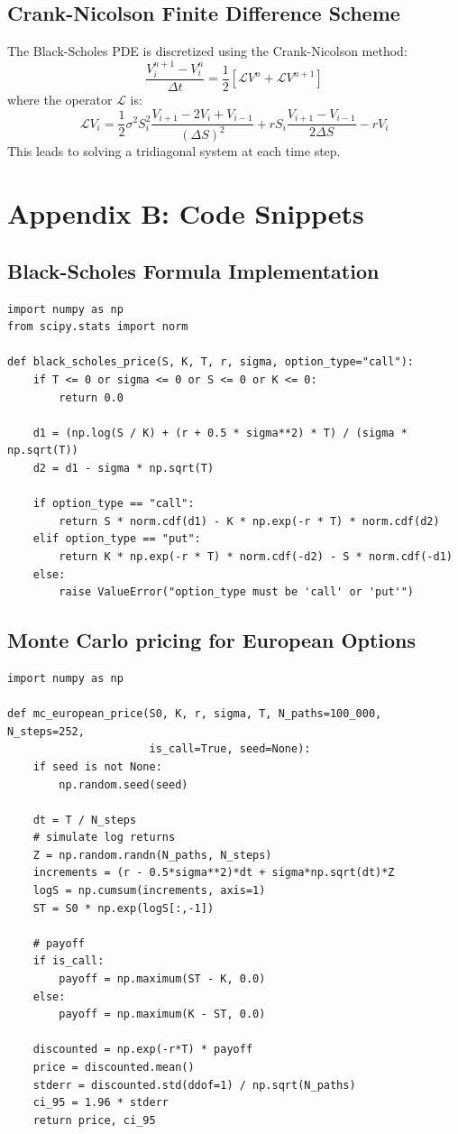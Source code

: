 \documentclass[12pt,a4paper]{article}
\begin{document}
\subsection{Crank-Nicolson Finite Difference Scheme}
The Black-Scholes PDE is discretized using the Crank-Nicolson method:
\[
\frac{V_i^{n+1} - V_i^n}{\Delta t} = \frac{1}{2} \left[ \mathcal{L} V^n + \mathcal{L} V^{n+1} \right]
\]
where the operator \(\mathcal{L}\) is:
\[
\mathcal{L} V_i = \frac{1}{2} \sigma^2 S_i^2 \frac{V_{i+1} - 2V_i + V_{i-1}}{(\Delta S)^2} 
+ r S_i \frac{V_{i+1} - V_{i-1}}{2 \Delta S} - r V_i
\]
This leads to solving a tridiagonal system at each time step.
\newpage

\section{Appendix B: Code Snippets}

\subsection{Black-Scholes Formula Implementation}
\begin{lstlisting}
import numpy as np
from scipy.stats import norm

def black_scholes_price(S, K, T, r, sigma, option_type="call"):
    if T <= 0 or sigma <= 0 or S <= 0 or K <= 0:
        return 0.0

    d1 = (np.log(S / K) + (r + 0.5 * sigma**2) * T) / (sigma * np.sqrt(T))
    d2 = d1 - sigma * np.sqrt(T)

    if option_type == "call":
        return S * norm.cdf(d1) - K * np.exp(-r * T) * norm.cdf(d2)
    elif option_type == "put":
        return K * np.exp(-r * T) * norm.cdf(-d2) - S * norm.cdf(-d1)
    else:
        raise ValueError("option_type must be 'call' or 'put'")
\end{lstlisting}

\vspace{1em}

\subsection{Monte Carlo pricing for European Options}
\begin{lstlisting}
import numpy as np

def mc_european_price(S0, K, r, sigma, T, N_paths=100_000, N_steps=252, 
                      is_call=True, seed=None):
    if seed is not None:
        np.random.seed(seed)

    dt = T / N_steps
    # simulate log returns
    Z = np.random.randn(N_paths, N_steps)
    increments = (r - 0.5*sigma**2)*dt + sigma*np.sqrt(dt)*Z
    logS = np.cumsum(increments, axis=1)
    ST = S0 * np.exp(logS[:,-1])

    # payoff
    if is_call:
        payoff = np.maximum(ST - K, 0.0)
    else:
        payoff = np.maximum(K - ST, 0.0)

    discounted = np.exp(-r*T) * payoff
    price = discounted.mean()
    stderr = discounted.std(ddof=1) / np.sqrt(N_paths)
    ci_95 = 1.96 * stderr
    return price, ci_95
\end{lstlisting}
\end{document}

